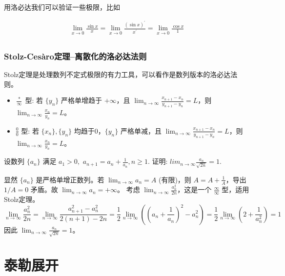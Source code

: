 \documentclass[lang=cn,newtx,10pt,scheme=chinese]{elegantbook}
\begin{document}
用洛必达我们可以验证一些极限，比如

\begin{example}
  \begin{equation}
    \begin{aligned}
    \lim_{x \to 0} \frac{\sin x }{x}=\lim_{x \to 0} \frac{(\sin x)^{\prime }}{x^{\prime }}=\lim_{x \to 0} \frac{\cos x}{1} \\
    \end{aligned}
  \end{equation}
\end{example}

\subsubsection{Stolz-Cesàro定理--离散化的洛必达法则}
Stolz定理是处理数列不定式极限的有力工具，可以看作是数列版本的洛必达法则。
\begin{itemize}
    \item $\frac{*}{\infty}$ 型: 若 $\{y_n\}$ 严格单增趋于 $+\infty$，且 $\lim_{n\to\infty} \frac{x_{n+1}-x_n}{y_{n+1}-y_n} = L$，则 $\lim_{n\to\infty} \frac{x_n}{y_n} = L$。
    \item $\frac{0}{0}$ 型: 若 $\{x_n\}, \{y_n\}$ 均趋于0，$\{y_n\}$ 严格单减，且 $\lim_{n\to\infty} \frac{x_{n+1}-x_n}{y_{n+1}-y_n} = L$，则 $\lim_{n\to\infty} \frac{x_n}{y_n} = L$。
\end{itemize}
\begin{problem}[CMC真题]
 设数列 $\{a_{n}\}$ 满足 $a_{1}>0,$ $a_{n+1}=a_{n}+\frac{1}{a_{n}},n\ge1.$ 证明:
$lim_{n\rightarrow\infty}\frac{a_{n}}{\sqrt{2n}}=1.$
\end{problem}
\begin{solution}
    显然 $\{a_n\}$ 是严格单增正数列。若 $\lim_{n\to\infty} a_n = A$ (有限)，则 $A=A+\frac{1}{A}$，导出 $1/A=0$ 矛盾。故 $\lim_{n\to\infty} a_n = +\infty$。
    考虑 $\lim_{n\to\infty} \frac{a_n^2}{2n}$，这是一个 $\frac{\infty}{\infty}$ 型，适用Stolz定理。
    \begin{equation*}
        \lim_{n\to\infty} \frac{a_n^2}{2n} = \lim_{n\to\infty} \frac{a_{n+1}^2 - a_n^2}{2(n+1)-2n} = \frac{1}{2}\lim_{n\to\infty} \left( (a_n+\frac{1}{a_n})^2 - a_n^2 \right) = \frac{1}{2}\lim_{n\to\infty} (2 + \frac{1}{a_n^2}) = 1
    \end{equation*}
    因此 $\lim_{n\to\infty} \frac{a_n}{\sqrt{2n}} = 1$。
\end{solution}
\section{泰勒展开}
\end{document}
